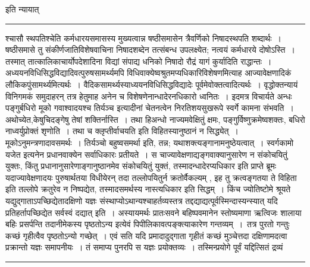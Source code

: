 \documentclass[11pt, openany]{book}
\newcommand\alfootnote[1]{%
  \begingroup
  \renewcommand\thefootnoteA{}\footnoteA{#1}%
  \addtocounter{footnoteA}{-1}%
  \endgroup
}
\begin{document}
\alfootnote{टिप्प०\textemdash\ $^{1}$पेक्षत्वेनेति पाठो भाति~।}
\newpage
\fancyhead[RE]{[अधिकारविधि\textemdash\ }
{\bl{} इति न्यायात्}\\
\hrule
\vspace{3mm}
\noindent
श्चासौ स्थपतिश्चेति कर्मधारयसमासस्य मुख्यत्वान्न षष्ठीसमासेन त्रैवर्णिको {\qt निषादस्थपति} शब्दार्थः~। षष्ठीसमासे तु संकीर्णजातिविशेषवाचिना निषादशब्देन तत्संबन्ध उपलक्ष्येत; नत्वयं कर्मधारये दोषोऽस्ति~। तस्मात् तात्कालिकाचार्योपदेशादिना विद्यां संपाद्य धनिको निषादो रौद्रं यागं कुर्यादिति राद्धान्तः~। अध्ययनविधिसिद्धविद्यादिवत्पुरुषसामर्थ्यमपि विधिवाक्येष्वश्रुतमप्यधिकारिविशेषणमित्याह आज्यावेक्षणादिकं लौकिकपुंसामर्थ्यमित्यर्थः~। वैदिकसामर्थ्यस्याध्ययनविधिसिद्धविद्यादेः पूर्वमेवोक्तत्वादित्यर्थः~। वृद्धोक्तन्यायं विनिगमकं समुदाहरन् तत्र हेतुमाह अनेन च विशेषणेनान्धादेरनधिकारो ध्वनितः~। इदमत्र विचार्यते {\qt अन्धः पङ्गुर्बधिरो मूको गवाश्वादयश्च तिर्यञ्च इत्यादीनां चेतनत्वेन
निरतिशयसुखरूपे स्वर्गे कामना संभवति~}। अथोच्येत,\textendash केषुचिदङ्गेषु तेषां शक्तिर्नास्ति~। तथा हि\textendash अन्धो नाज्यमवेक्षितुं क्षमः,
पङ्गुर्विष्णुक्रमेष्वशक्तः, बधिरो नाध्वर्युप्रोक्तं शृणोति~। तथा च {\qt क्लृप्तीर्वाचयति} इति विहितस्यानुष्ठानं न सिद्ध्येत्~। मूकोऽनुमन्त्रणादावसमर्थः~। तिर्यञ्चो बहुष्वसमर्था इति, तन्न; यथाशक्त्यङ्गानामनुष्ठेयत्वात्~। {\qt स्वर्गकामो यजेत} इत्यनेन प्रधानवाक्येन सर्वाधिकारः प्रतीयते~। स चाज्यावेक्षणाद्यङ्गवाक्यानुसारेण न संकोचयितुं
युक्तः, किंतु प्रधानानुसारेणाङ्गानुष्ठानमेव संकोचयितुं युक्तं, तस्मादन्धादेरप्यधिकार इति प्राप्ते ब्रूमः {\qt यदाज्यावेक्षणादयः पुरुषार्थतया विधीयेरन् तदा तल्लोपयितुर्न क्रतोर्वैकल्यम् , इह तु क्रत्वङ्गतया ते विहिता इति तल्लोपे क्रतुरेव न निष्पद्येत, तस्मादसमर्थस्य नास्त्यधिकार इति सिद्धम्~}। किंच ज्योतिष्टोमे श्रूयते {\qt यद्युद्गाताऽपच्छिद्येतादक्षिणो यज्ञः संस्थाप्योऽथान्यश्चाहर्तव्यस्तत्र तद्दद्याद्यत्पूर्वस्मिन्दास्यन्स्यात् यदि प्रतिहर्तापच्छिद्येत सर्वस्वं दद्यात्} इति~। अस्यायमर्थः {\qt प्रातःसवने
बहिष्पवमानेन स्तोष्यमाणा ऋत्विजः शालाया बहिः प्रसर्पन्ति तदानीमेकस्य पृष्ठतोऽन्य इत्येवं पिपीलिकावत्पङ्क्त्याकारेण गन्तव्यम्~}।~तत्र पुरतो गन्तुः कच्छं गृहीत्वैव पृष्ठतोऽन्यो गच्छेत्~। एवं सति यदि प्रमादादुद्गाता गृहीतं कच्छं मुञ्चेत्तदा दक्षिणामदत्वा प्रक्रान्तो यज्ञः समापनीयः~। तं समाप्य पुनरपि स यज्ञः प्रयोक्तव्यः~। तस्मिन्प्रयोगे पूर्वं
यद्दित्सितं द्रव्यं
\newpage
\fancyhead[LO]{लक्षणम्]}
\hrule
\vspace{3mm}
\noindent
\end{document}
